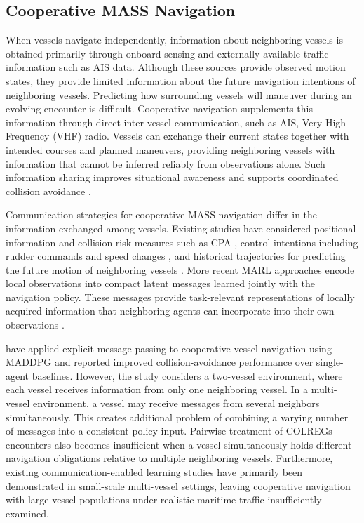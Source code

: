 \documentclass[final,5p,times,twocolumn]{elsarticle}
\begin{document}
\subsection{Cooperative MASS Navigation}
{\color{violet}
When vessels navigate independently, information about neighboring vessels is obtained primarily through onboard sensing and externally available traffic information such as AIS data. Although these sources provide observed motion states, they provide limited information about the future navigation intentions of neighboring vessels. Predicting how surrounding vessels will maneuver during an evolving encounter is difficult. Cooperative navigation supplements this information through direct inter-vessel communication, such as AIS, Very High Frequency (VHF) radio. Vessels can exchange their current states together with intended courses and planned maneuvers, providing neighboring vessels with information that cannot be inferred reliably from observations alone. Such information sharing improves situational awareness and supports coordinated collision avoidance \citep{Akdag,chen}.

Communication strategies for cooperative MASS navigation differ in the information exchanged among vessels. Existing studies have considered positional information and collision-risk measures such as CPA \citep{58}, control intentions including rudder commands and speed changes \citep{82}, and historical trajectories for predicting the future motion of neighboring vessels \citep{29}. More recent MARL approaches encode local observations into compact latent messages learned jointly with the navigation policy. These messages provide task-relevant representations of locally acquired information that neighboring agents can incorporate into their own observations \citep{WangZhao2025}.

\citet{WangZhao2025} have applied explicit message passing to cooperative vessel navigation using MADDPG and reported improved collision-avoidance performance over single-agent baselines. However, the study considers a two-vessel environment, where each vessel receives information from only one neighboring vessel. In a multi-vessel environment, a vessel may receive messages from several neighbors simultaneously. This creates additional problem of combining a varying number of messages into a consistent policy input. Pairwise treatment of COLREGs encounters also becomes insufficient when a vessel simultaneously holds different navigation obligations relative to multiple neighboring vessels. Furthermore, existing communication-enabled learning studies have primarily been demonstrated in small-scale multi-vessel settings, leaving cooperative navigation with large vessel populations under realistic maritime traffic insufficiently examined.

}
\end{document}
